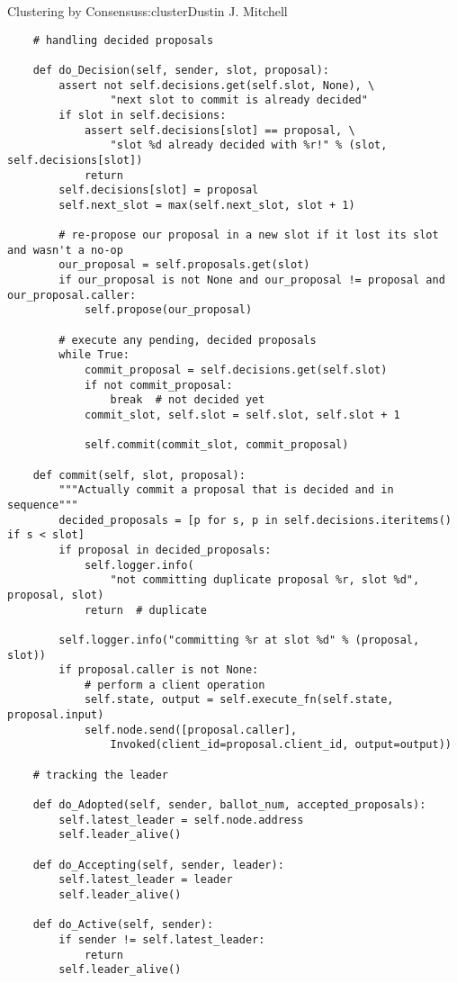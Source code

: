 \begin{aosachapter}{Clustering by Consensus}{s:cluster}{Dustin J. Mitchell}
\begin{verbatim}
    # handling decided proposals

    def do_Decision(self, sender, slot, proposal):
        assert not self.decisions.get(self.slot, None), \
                "next slot to commit is already decided"
        if slot in self.decisions:
            assert self.decisions[slot] == proposal, \
                "slot %d already decided with %r!" % (slot, self.decisions[slot])
            return
        self.decisions[slot] = proposal
        self.next_slot = max(self.next_slot, slot + 1)

        # re-propose our proposal in a new slot if it lost its slot and wasn't a no-op
        our_proposal = self.proposals.get(slot)
        if our_proposal is not None and our_proposal != proposal and our_proposal.caller:
            self.propose(our_proposal)

        # execute any pending, decided proposals
        while True:
            commit_proposal = self.decisions.get(self.slot)
            if not commit_proposal:
                break  # not decided yet
            commit_slot, self.slot = self.slot, self.slot + 1

            self.commit(commit_slot, commit_proposal)

    def commit(self, slot, proposal):
        """Actually commit a proposal that is decided and in sequence"""
        decided_proposals = [p for s, p in self.decisions.iteritems() if s < slot]
        if proposal in decided_proposals:
            self.logger.info(
                "not committing duplicate proposal %r, slot %d", proposal, slot)
            return  # duplicate

        self.logger.info("committing %r at slot %d" % (proposal, slot))
        if proposal.caller is not None:
            # perform a client operation
            self.state, output = self.execute_fn(self.state, proposal.input)
            self.node.send([proposal.caller], 
                Invoked(client_id=proposal.client_id, output=output))

    # tracking the leader

    def do_Adopted(self, sender, ballot_num, accepted_proposals):
        self.latest_leader = self.node.address
        self.leader_alive()

    def do_Accepting(self, sender, leader):
        self.latest_leader = leader
        self.leader_alive()

    def do_Active(self, sender):
        if sender != self.latest_leader:
            return
        self.leader_alive()


\end{verbatim}
\end{aosachapter}
